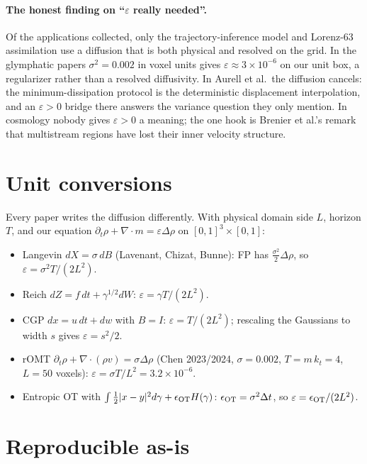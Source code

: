 \documentclass[11pt]{article}
\newcommand{\eps}{\varepsilon}
\newcommand{\dv}{\nabla\cdot}
\begin{document}
\paragraph{The honest finding on ``$\eps$ really needed''.} Of the applications collected, only the trajectory-inference model and Lorenz-63 assimilation use a diffusion that is both physical and resolved on the grid. In the glymphatic papers $\sigma^2=0.002$ in voxel units gives $\eps\approx3\times10^{-6}$ on our unit box, a regularizer rather than a resolved diffusivity. In Aurell et al.\ the diffusion cancels: the minimum-dissipation protocol is the deterministic displacement interpolation, and an $\eps>0$ bridge there answers the variance question they only mention. In cosmology nobody gives $\eps>0$ a meaning; the one hook is Brenier et al.'s remark that multistream regions have lost their inner velocity structure.

\section{Unit conversions}
\label{sec:units}
Every paper writes the diffusion differently. With physical domain side $L$, horizon $T$, and our equation $\partial_t\rho+\dv m=\eps\Delta\rho$ on $[0,1]^3\times[0,1]$:
\begin{itemize}
  \item Langevin $dX=\sigma\,dB$ (Lavenant, Chizat, Bunne): FP has $\tfrac{\sigma^2}{2}\Delta\rho$, so $\eps=\sigma^2T/(2L^2)$.
  \item Reich $dZ=f\,dt+\gamma^{1/2}dW$: $\eps=\gamma T/(2L^2)$.
  \item CGP $dx=u\,dt+dw$ with $B=I$: $\eps=T/(2L^2)$; rescaling the Gaussians to width $s$ gives $\eps=s^2/2$.
  \item rOMT $\partial_t\rho+\dv(\rho v)=\sigma\Delta\rho$ (Chen 2023/2024, $\sigma=0.002$, $T=m\,k_t=4$, $L=50$ voxels): $\eps=\sigma T/L^2=3.2\times10^{-6}$.
  \item Entropic OT with $\int\tfrac12|x-y|^2d\gamma+\epsilon_{\rm OT}H(\gamma)$: $\epsilon_{\rm OT}=\sigma^2\Delta t$, so $\eps=\epsilon_{\rm OT}/(2L^2)$.
\end{itemize}

\section{Reproducible as-is}
\label{sec:asis}
\end{document}
